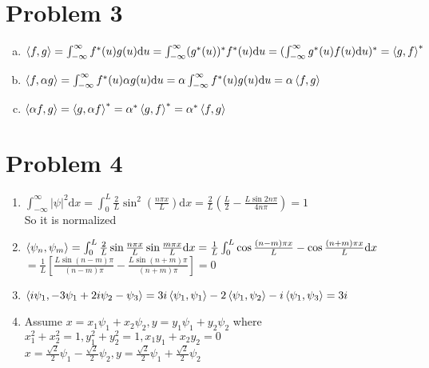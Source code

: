 \documentclass[a4paper]{article}
\begin{document}
\section{Problem 3}
\begin{enumerate}[(a)]
    \item $\braket{f,g}=\int_{-\infty}^\infty f^*(u)g(u)\mathrm{d}u=\int_{-\infty}^\infty (g^*(u))^*f^*(u)\mathrm{d}u=(\int_{-\infty}^\infty g^*(u)f(u)\mathrm{d}u)^*=\braket{g,f}^*$
    \item $\braket{f,\alpha g}=\int_{-\infty}^\infty f^*(u)\alpha g(u)\mathrm{d}u=\alpha\int_{-\infty}^\infty f^*(u)g(u)\mathrm{d}u=\alpha\braket{f,g}$
    \item $\braket{\alpha f,g}=\braket{g,\alpha f}^*=\alpha^*\braket{g,f}^*=\alpha^*\braket{f,g}$
\end{enumerate}
\section{Problem 4}
    \begin{enumerate}
        \item $\int_{-\infty}^\infty|\psi|^2\mathrm{d}x=\int_0^L\frac{2}{L}\sin^2(\frac{n\pi x}{L})\mathrm{d}x=\frac{2}{L}(\frac{L}{2}-\frac{L\sin 2n\pi}{4n\pi})=1$
        \\So it is normalized
        \item $\braket{\psi_n,\psi_m}=\int_0^L\frac{2}{L}\sin\frac{n\pi x}{L}\sin\frac{m\pi x}{L}\mathrm{d}x=\frac{1}{L}\int_0^L\cos\frac{(n-m)\pi x}{L}-\cos\frac{(n+m)\pi x}{L}\mathrm{d}x$
        \\$=\frac{1}{L}[\frac{L\sin(n-m)\pi}{(n-m)\pi}-\frac{L\sin(n+m)\pi}{(n+m)\pi}]=0$
        \item $\braket{i\psi_1,-3\psi_1+2i\psi_2-\psi_3}=3i\braket{\psi_1,\psi_1}-2\braket{\psi_1,\psi_2}-i\braket{\psi_1,\psi_3}=3i$
        \item Assume $x=x_1\psi_1+x_2\psi_2,y=y_1\psi_1+y_2\psi_2$ where
        \\$x_1^2+x_2^2=1,y_1^2+y_2^2=1,x_1y_1+x_2y_2=0$
        \\$x=\frac{\sqrt{2}}{2}\psi_1-\frac{\sqrt{2}}{2}\psi_2,y=\frac{\sqrt{2}}{2}\psi_1+\frac{\sqrt{2}}{2}\psi_2$
    \end{enumerate}
\end{document}
